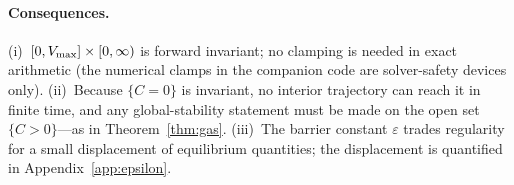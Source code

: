 \paragraph{Consequences.}
(i)~$[0,V_{\max}]\times[0,\infty)$ is forward invariant; no clamping is needed
in exact arithmetic (the numerical clamps in the companion code are
solver-safety devices only).
(ii)~Because $\{C=0\}$ is invariant, no interior trajectory can reach it in
finite time, and any global-stability statement must be made on the open
set $\{C>0\}$---as in Theorem~\ref{thm:gas}.
(iii)~The barrier constant $\varepsilon$ trades regularity for a small
displacement of equilibrium quantities; the displacement is quantified in
Appendix~\ref{app:epsilon}.
